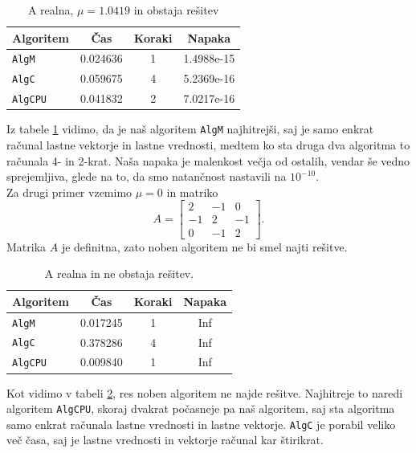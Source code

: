 \documentclass[12pt,a4paper]{amsart}
\theoremstyle{definition}
\theoremstyle{plain}
\begin{document}
\begin{table}[H]
\caption{A realna, $\mu = 1.0419$ in obstaja rešitev}
\begin{tabular}{|l|c|c|c|}
\hline
Algoritem & Čas & Koraki & Napaka\\
\hline
\hline
\verb+AlgM+ &0.024636&1&1.4988e-15\\
\hline
\verb+AlgC+ & 0.059675& 4&5.2369e-16 \\
\hline
\verb+AlgCPU+ &0.041832&2&7.0217e-16 \\
\hline
\end{tabular}
\label{t1}
\end{table}
Iz tabele \ref{t1} vidimo, da je naš algoritem \verb+AlgM+ najhitrejši, saj je samo enkrat računal lastne vektorje in lastne vrednosti, medtem ko sta druga dva algoritma to računala 4- in 2-krat. 
Naša napaka je malenkost večja od ostalih, vendar še vedno sprejemljiva, glede na to, da smo natančnost nastavili na $10^{-10}$.\\
Za drugi primer vzemimo $\mu =0$ in matriko
\begin{equation*}
A=\begin{bmatrix}
2 &-1&0\\
-1&2&-1\\
0&-1&2
\end{bmatrix}.
\end{equation*}
Matrika $A$ je definitna, zato noben algoritem ne bi smel najti rešitve. 

\begin{table}[H]
\caption{A realna in ne obstaja rešitev.}
\begin{tabular}{|l|c|c|c|}
\hline
Algoritem & Čas & Koraki & Napaka\\
\hline
\hline
\verb+AlgM+ &0.017245&1&Inf \\
\hline
\verb+AlgC+ & 0.378286&4 & Inf \\
\hline
\verb+AlgCPU+ &0.009840 &1& Inf\\
\hline
\end{tabular}

\label{t2}
\end{table}

Kot vidimo v tabeli \ref{t2}, res noben algoritem ne najde rešitve. Najhitreje to naredi algoritem \verb-AlgCPU-, skoraj dvakrat počasneje pa naš algoritem, saj sta algoritma samo enkrat računala lastne vrednosti in lastne vektorje. \verb+AlgC+ je porabil veliko več časa, saj je lastne vrednosti in vektorje računal kar štirikrat.
\end{document}
